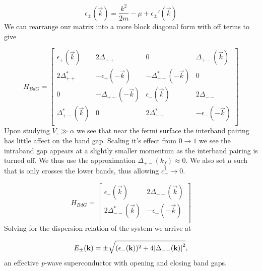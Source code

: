 \begin{equation}
  \epsilon_{\pm}(\vec{k}) = \dfrac{k^2}{2m} - \mu + \epsilon_{\pm}'(\vec{k})
\end{equation}
We can rearrange our matrix into a more block diagonal form with off terms to give

\begin{equation}
  H_{BdG} =
  \begin{bmatrix}
    \epsilon_+(\vec{k}) & 2\Delta_{++} & 0 & \Delta_{+-}(\vec{k}) \\
    2\Delta_{++}^* & -\epsilon_+(-\vec{k}) & -\Delta_{+-}^*(-\vec{k}) & 0 \\
    0 & -\Delta_{+-}(-\vec{k}) & \epsilon_-(\vec{k}) & 2\Delta_{--} \\
    \Delta_{+-}^*(\vec{k}) & 0 & 2\Delta_{--}^* & -\epsilon_-(-\vec{k}) \\
  \end{bmatrix}
\end{equation}
Upon studying $V_z \gg \alpha$ we see that near the fermi surface the interband pairing has little affect on the band gap. Scaling it's effect from $0 \to 1$ we see the intraband gap appears at a slightly smaller momentum as the interband pairing is turned off. We thus use the approximation $\Delta_{+-}(k_f) \approx 0$. We also set $\mu$ such that is only crosses the lower bands, thus allowing $c_+^{\dagger} \to 0$.

\begin{equation}
  H_{BdG} =
  \begin{bmatrix}
    \epsilon_-(\vec{k}) & 2\Delta_{--}(\vec{k}) \\
    2\Delta_{--}^*(\vec{k}) & -\epsilon_-(-\vec{k}) \\
  \end{bmatrix}
\end{equation}
Solving for the dispersion relation of the system we arrive at

\begin{align}
  E_{\pm}(\mathbf{k}) = \pm \sqrt{(\epsilon_-(\mathbf{k}))^2+4\abs{\Delta_{--}(\mathbf{k})}^2},
\end{align}
an effective \textit{p}-wave superconductor with opening and closing band gaps.

